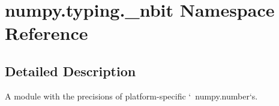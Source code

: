 \hypertarget{namespacenumpy_1_1typing_1_1__nbit}{}\section{numpy.\+typing.\+\_\+nbit Namespace Reference}
\label{namespacenumpy_1_1typing_1_1__nbit}


\subsection{Detailed Description}
\begin{DoxyVerb}A module with the precisions of platform-specific `~numpy.number`s.\end{DoxyVerb}
 